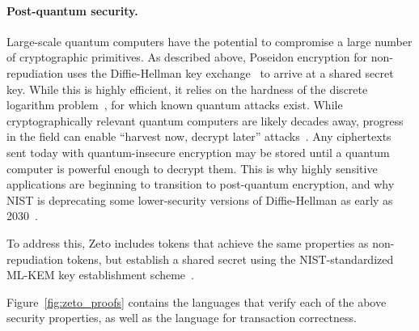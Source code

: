 \paragraph{Post-quantum security.} Large-scale quantum computers have the potential to compromise a large number of cryptographic primitives. As described above, Poseidon encryption for non-repudiation uses the Diffie-Hellman key exchange~\cite{TODO} to arrive at a shared secret key. While this is highly efficient, it relies on the hardness of the discrete logarithm problem~\cite{TODO}, for which known quantum attacks exist. While cryptographically relevant quantum computers are likely decades away, progress in the field can enable ``harvest now, decrypt later'' attacks~\cite{TODO}. Any ciphertexts sent today with quantum-insecure encryption may be stored until a quantum computer is powerful enough to decrypt them. This is why highly sensitive applications are beginning to transition to post-quantum encryption, and why NIST is deprecating some lower-security versions of Diffie-Hellman as early as 2030~\cite{TODO}.

To address this, Zeto includes tokens that achieve the same properties as non-repudiation tokens, but establish a shared secret using the NIST-standardized ML-KEM key establishment scheme~\cite{TODO}.

Figure~\ref{fig:zeto_proofs} contains the languages that verify each of the above security properties, as well as the language for transaction correctness.

